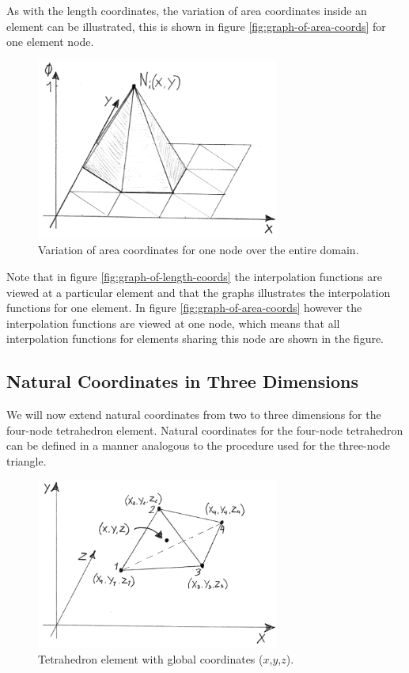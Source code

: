 As with the length coordinates, the variation of area coordinates
inside an element can be illustrated, this is shown in figure
\vref{fig:graph-of-area-coords} for one element node.

\begin{figure}
  \centering
  \includegraphics[width=8cm]{./images/finite_element_method_graph_of_area_coords.png}
\caption{Variation of area coordinates for one node over the entire domain.}
\label{fig:graph-of-area-coords}
\end{figure}

Note that in figure \vref{fig:graph-of-length-coords} the interpolation
functions are viewed at a particular element and that the graphs
illustrates the interpolation functions for one element. In figure
\vref{fig:graph-of-area-coords} however the interpolation functions are
viewed at one node, which means that all interpolation functions for
elements sharing this node are shown in the figure.

\subsection{Natural Coordinates in Three Dimensions}
\label{sec:natural-coordinates-3d}
We will now extend natural coordinates from two to three
dimensions for the four-node tetrahedron element.
%
Natural coordinates for the four-node tetrahedron can be defined in a
manner analogous to the procedure used for the three-node triangle.

\begin{figure}
  \centering
  \includegraphics[width=8cm]{./images/finite_element_method_point_in_tetrahedron.png}
\caption{Tetrahedron element with global coordinates ($x$,$y$,$z$).}
\label{fig:point-in-tetrahedron}
\end{figure}

